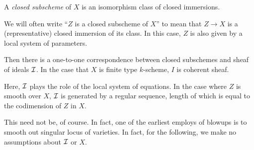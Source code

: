 \begin{definition}
A \emph{closed subscheme} of $X$ is an isomorphism class of 
closed immersions. 
\end{definition}

We will often write ``$Z$ is a closed subscheme of $X$'' to mean 
that $Z \to X$ is a (representative) closed immersion of its class.
In this case, $Z$ is also given by a local system of parameters.

\begin{prop}
Then there is a one-to-one correspondence between closed 
subschemes and sheaf of ideals $\mathcal{I}$. In the case that $X$ is
finite type $k$-scheme, $I$ is coherent sheaf.
\end{prop}

Here, $\mathcal{I}$ plays the role of the local system of equations. In
the case where $Z$ is smooth over $X$, $\mathcal{I}$ is generated by a
regular sequence, length of which is equal to the codimension
of $Z$ in $X$.

This need not be, of course. In fact, one of the earliest employs
of blowups is to smooth out singular locus of varieties. 
In fact, for the following, we make no assumptions about $\mathcal{I}$ or
$X$.
